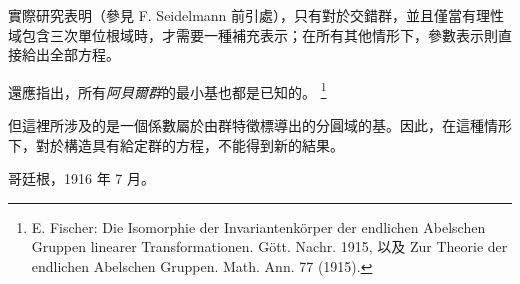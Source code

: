 \documentclass[11pt]{article}
\providecommand{\srcfn}[2]{%
  \begingroup
  \renewcommand{\thefootnote}{#1}%
  \footnote{#2}%
  \addtocounter{footnote}{-1}%
  \endgroup}
\begin{document}
實際研究表明（參見 F. Seidelmann 前引處），只有對於交錯群，並且僅當有理性域包含三次單位根域時，才需要一種補充表示；在所有其他情形下，參數表示則直接給出全部方程。

還應指出，所有\emph{阿貝爾群}的最小基也都是已知的。\srcfn{**)}{E. Fischer: Die Isomorphie der Invariantenkörper der endlichen Abelschen Gruppen linearer Transformationen. Gött. Nachr. 1915, 以及 Zur Theorie der endlichen Abelschen Gruppen. Math. Ann. 77 (1915).} 但這裡所涉及的是一個係數屬於由群特徵標導出的分圓域的基。因此，在這種情形下，對於構造具有給定群的方程，不能得到新的結果。

哥廷根，1916 年 7 月。

\clearpage
\setcounter{footnote}{0}
\providecommand{\bdelta}{\bar{\delta}}
\end{document}
